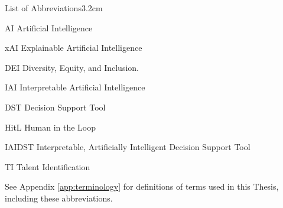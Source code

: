 \begin{mclistof}{List of Abbreviations}{3.2cm}
    \item[AI] Artificial Intelligence
    \item[xAI] Explainable Artificial Intelligence
    \item[DEI] Diversity, Equity, and Inclusion.
    \item[IAI] Interpretable Artificial Intelligence
    \item[DST] Decision Support Tool
    \item[HitL] Human in the Loop 
    \item[IAIDST] Interpretable, Artificially Intelligent Decision Support Tool
    \item[TI] Talent Identification 
\end{mclistof}
See Appendix \ref{app:terminology} for definitions of terms used in this Thesis, including these abbreviations.